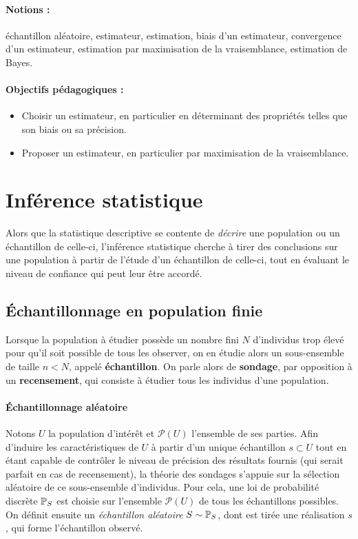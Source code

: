 \label{chap:estimation}

\paragraph{Notions :} échantillon aléatoire, estimateur, estimation, biais d'un
estimateur, convergence d'un estimateur, estimation par maximisation de la
vraisemblance, estimation de Bayes.
\paragraph{Objectifs pédagogiques :}
\begin{itemize}
\setlength{\itemsep}{3pt}
\item Choisir un estimateur, en particulier en déterminant des propriétés
  telles que son biais ou sa précision.
\item Proposer un estimateur, en particulier par maximisation de la
  vraisemblance.
\end{itemize}


\section{Inférence statistique}
Alors que la statistique descriptive se contente de \textit{décrire} une
population ou un échantillon de celle-ci, l'inférence statistique cherche à
tirer des conclusions sur une population à partir de l'étude d'un échantillon
de celle-ci, tout en évaluant le niveau de confiance qui peut leur être accordé.

\subsection{Échantillonnage en population finie}
\label{ref:echantilonnage}

Lorsque la population à étudier possède un nombre fini $N$ d'individus trop élevé pour qu'il soit possible
de tous les observer, on en étudie alors un sous-ensemble de taille $n < N$, appelé \textbf{échantillon}. On parle alors de
\textbf{sondage}, par opposition à un \textbf{recensement}, qui consiste à
étudier tous les individus d'une population.

\paragraph{Échantillonnage aléatoire}
Notons $U$ la population d'intérêt et $\mathcal{P}(U)$ l'ensemble de ses parties. Afin d'induire les caractéristiques de $U$ à partir d'un unique échantillon $s \subset U$ tout en étant capable de contrôler le niveau de précision des résultats fournis (qui serait parfait en cas de recensement), la théorie des sondages s'appuie sur la sélection aléatoire de ce sous-ensemble d'individus. Pour cela, une loi de probabilité discrète $\mathbb{P}_S$ est choisie sur l'ensemble $\mathcal{P}(U)$ de tous les échantillons possibles. On définit ensuite un \textit{échantillon aléatoire} $S \sim \mathbb{P}_S$, dont est tirée une réalisation $s$, qui forme l'échantillon observé.  


